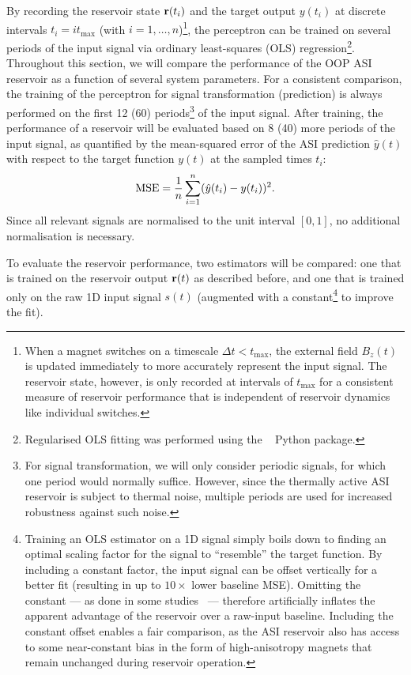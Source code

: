 By recording the reservoir state $\boldsymbol{\mathbf{r}}(t_i)$ and the target output $y(t_i)$ at discrete intervals $t_i = i t_\mathrm{max}$ (with $i = 1,\dots,n$)\footnote{
	When a magnet switches on a timescale $\Delta t < t_\mathrm{max}$, the external field $B_z(t)$ is updated immediately to more accurately represent the input signal.
	The reservoir state, however, is only recorded at intervals of $t_\mathrm{max}$ for a consistent measure of reservoir performance that is independent of reservoir dynamics like individual switches.
}, the perceptron can be trained on several periods of the input signal via ordinary least-squares (OLS) regression\footnote{
	Regularised OLS fitting was performed using the ~\cite{statsmodels} Python package.
}.
Throughout this section, we will compare the performance of the OOP ASI reservoir as a function of several system parameters.
For a consistent comparison, the training of the perceptron for signal transformation (prediction) is always performed on the first 12 (60) periods\footnote{
	For signal transformation, we will only consider periodic signals, for which one period would normally suffice.
	However, since the thermally active ASI reservoir is subject to thermal noise, multiple periods are used for increased robustness against such noise.
} of the input signal.
After training, the performance of a reservoir will be evaluated based on 8 (40) more periods of the input signal, as quantified by the mean-squared error of the ASI prediction $\hat{y}(t)$ with respect to the target function $y(t)$ at the sampled times $t_i$:
\begin{equation}
	\label{eq:3:MSE}
	\mathrm{MSE} = \frac{1}{n} \sum_{i=1}^n (\hat{y}(t_i) - y(t_i))^2 \mathrm{.}
\end{equation}
Since all relevant signals are normalised to the unit interval $[0,1]$, no additional normalisation is necessary. \par
To evaluate the reservoir performance, two estimators will be compared: one that is trained on the reservoir output $\boldsymbol{\mathbf{r}}(t)$ as described before, and one that is trained only on the raw 1D input signal $s(t)$ (augmented with a constant\footnote{
	Training an OLS estimator on a 1D signal simply boils down to finding an optimal scaling factor for the signal to ``resemble'' the target function.
	By including a constant factor, the input signal can be offset vertically for a better fit (resulting in up to $10 \times$ lower baseline MSE).
	Omitting the constant --- as done in some studies~\cite{gartside2022reconfigurable} --- therefore artificially inflates the apparent advantage of the reservoir over a raw-input baseline.
	Including the constant offset enables a fair comparison, as the ASI reservoir also has access to some near-constant bias in the form of high-anisotropy magnets that remain unchanged during reservoir operation.
} to improve the fit).

